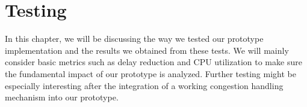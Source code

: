 
\chapter{Testing}\label{chap:testing}

In this chapter, we will be discussing the way we tested our prototype
implementation and the results we obtained from these tests.
We will mainly consider basic metrics such as delay reduction and 
CPU utilization to make sure the fundamental impact of our prototype
is analyzed.
Further testing might be especially interesting after the integration
of a working congestion handling mechanism into our prototype.



